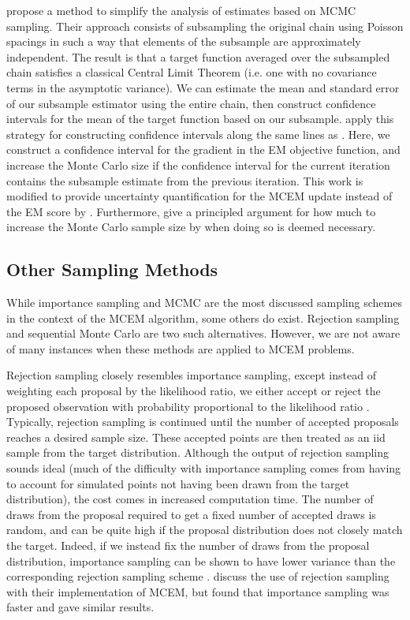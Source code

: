 \documentclass[11pt, oneside]{article}   	%
\begin{document}
\citet{Lev01} propose a method to simplify the analysis of estimates based on MCMC sampling. Their approach consists of subsampling the original chain using Poisson spacings in such a way that elements of the subsample are approximately independent. The result is that a target function averaged over the subsampled chain satisfies a classical Central Limit Theorem (i.e. one with no covariance terms in the asymptotic variance). We can estimate the mean and standard error of our subsample estimator using the entire chain, then construct confidence intervals for the mean of the target function based on our subsample. \citeauthor{Lev01} apply this strategy for constructing confidence intervals along the same lines as \citet{Boo99}. Here, we construct a confidence interval for the gradient in the EM objective function, and increase the Monte Carlo size if the confidence interval for the current iteration contains the subsample estimate from the previous iteration. This work is modified to provide uncertainty quantification for the MCEM update instead of the EM score by \citet{Lev04}. Furthermore, \citeauthor{Lev04} give a principled argument for how much to increase the Monte Carlo sample size by when doing so is deemed necessary.


\subsection{Other Sampling Methods}

While importance sampling and MCMC are the most discussed sampling schemes in the context of the MCEM algorithm, some others do exist. Rejection sampling and sequential Monte Carlo are two such alternatives. However, we are not aware of many instances when these methods are applied to MCEM problems.

Rejection sampling closely resembles importance sampling, except instead of weighting each proposal by the likelihood ratio, we either accept or reject the proposed observation with probability proportional to the likelihood ratio \citep{Cho20}. Typically, rejection sampling is continued until the number of accepted proposals reaches a desired sample size. These accepted points are then treated as an iid sample from the target distribution. Although the output of rejection sampling sounds ideal (much of the difficulty with importance sampling comes from having to account for simulated points not having been drawn from the target distribution), the cost comes in increased computation time. The number of draws from the proposal required to get a fixed number of accepted draws is random, and can be quite high if the proposal distribution does not closely match the target. Indeed, if we instead fix the number of draws from the proposal distribution, importance sampling can be shown to have lower variance than the corresponding rejection sampling scheme \citep[see Section 8.8 of][]{Cho20}. \citet{Boo99} discuss the use of rejection sampling with their implementation of MCEM, but found that importance sampling was faster and gave similar results.
\end{document}
